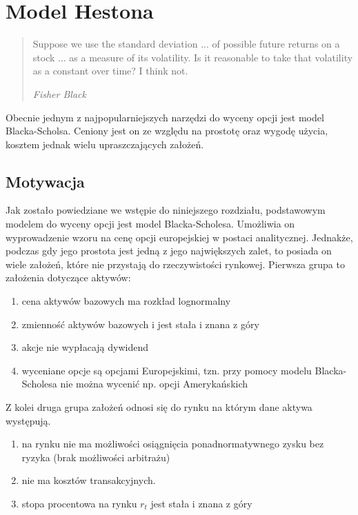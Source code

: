 \documentclass{pracamgr}
\begin{document}
 




%
%
\chapter{Model Hestona}
\label{chap:hestonModel}
\begin{quote}

  Suppose we use the standard deviation ... of possible future returns on
  a stock ... as a measure of its volatility. Is it reasonable to take
  that volatility as a constant over time? I think not.

\raggedleft\slshape Fisher Black 
\end{quote}


Obecnie jednym z najpopularniejszych narzędzi do wyceny opcji jest model Blacka-Scholsa. Ceniony jest on ze względu na prostotę oraz wygodę użycia, kosztem jednak wielu upraszczających założeń. 


\section{Motywacja} 
Jak zostało powiedziane we wstępie do niniejszego rozdziału, podstawowym modelem do wyceny opcji jest model Blacka-Scholesa.
Umożliwia on wyprowadzenie wzoru na cenę opcji europejskiej w postaci analitycznej. Jednakże, podczas gdy jego prostota jest jedną z jego największych zalet, to posiada on wiele założeń, które nie przystają do rzeczywistości rynkowej. Pierwsza grupa to założenia dotyczące aktywów:
\begin{enumerate}
\item cena aktywów bazowych ma rozkład lognormalny
\item zmienność aktywów bazowych i jest stała i znana z góry
\item akcje nie wypłacają dywidend
\item wyceniane opcje są opcjami Europejskimi, tzn. przy pomocy modelu Blacka-Scholesa nie można wycenić np. opcji Amerykańskich
\end{enumerate}
Z kolei druga grupa założeń odnosi się do rynku na którym dane aktywa występują.
\begin{enumerate}
\item na rynku nie ma możliwości osiągnięcia ponadnormatywnego zysku bez ryzyka (brak możliwości arbitrażu)
\item nie ma kosztów transakcyjnych.
\item stopa procentowa na rynku $r_t$ jest stała i znana z góry 
\end{enumerate}
\end{document}

